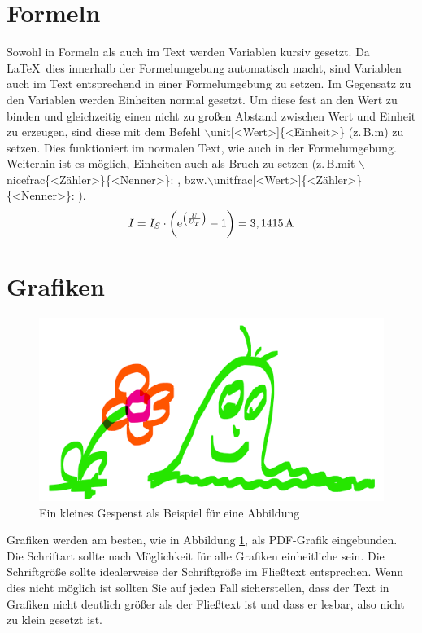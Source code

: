 \section{Formeln}
Sowohl in Formeln als auch im Text werden Variablen kursiv gesetzt.
Da \LaTeX\ dies innerhalb der Formelumgebung automatisch macht,
sind Variablen auch im Text entsprechend in einer Formelumgebung zu setzen.
Im Gegensatz zu den Variablen werden Einheiten normal gesetzt.
Um diese fest an den Wert zu binden und gleichzeitig einen nicht zu
großen Abstand zwischen Wert und Einheit zu erzeugen, sind diese
mit dem Befehl $\backslash$unit[<Wert>]\{<Einheit>\}
(z.\,B.\@ \unit[3]{m}) zu setzen.
Dies funktioniert im normalen Text, wie auch in der Formelumgebung.
Weiterhin ist es möglich, Einheiten auch als Bruch zu setzen
(z.\,B.\@ mit $\backslash$nicefrac\{<Zähler>\}\{<Nenner>\}: ,
bzw.\@ $\backslash$unitfrac[<Wert>]\{<Zähler>\}\{<Nenner>\}:
).
\begin{equation} \label{eq:beispiel}
  I = I_S \cdot \left( \exph{\left( \frac{U}{U_T}\right)} - 1\right) = \unit[3,1415]{A}
\end{equation}

\section{Grafiken}
\begin{figure}[hbt]
  \begin{center}
  \includegraphics[width=0.5\columnwidth]{images/Skizze}
  \caption{Ein kleines Gespenst als Beispiel für eine Abbildung \cite{GuKa92}}
  \label{fig:Skizze}
  \end{center}
\end{figure}
Grafiken werden am besten, wie in Abbildung \ref{fig:Skizze}, als PDF-Grafik eingebunden.
Die Schriftart sollte nach Möglichkeit für alle Grafiken einheitliche sein. Die Schriftgröße sollte idealerweise der Schriftgröße im Fließtext entsprechen. Wenn dies nicht möglich ist sollten Sie auf jeden Fall sicherstellen, dass der Text in Grafiken nicht deutlich größer als der Fließtext ist und dass er lesbar, also nicht zu klein gesetzt ist.

